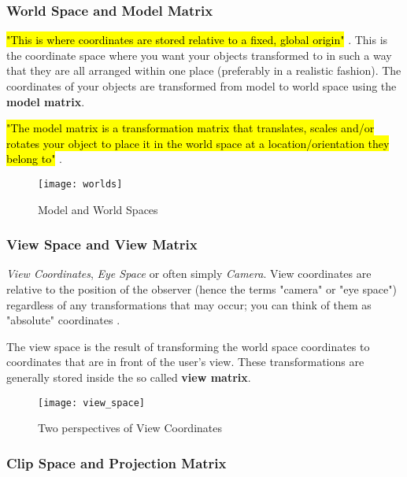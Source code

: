 \subsubsection{World Space and Model Matrix}

\hl{"This is where coordinates are stored relative to a fixed, global origin"} \cite{superbible}.
This is the coordinate space where you want your objects transformed to in such a way that they are all arranged within one place (preferably in a realistic fashion). The coordinates of your objects are transformed from model to world space using the \textbf{model matrix}.

 \label{model-matrix}

\hl{"The model matrix is a transformation matrix that translates, scales and/or rotates your object to place it in the world space at a location/orientation they belong to"} \cite{learnopengl}. 
\begin{figure}[h!]
	\centering
	\texttt{[image: worlds]}
	\caption{Model and World Spaces \cite{3dgraphics}}
	\label{fig:world-model-space}
\end{figure}

\subsubsection{View Space and View Matrix} \label{view-matrix}

\emph{View Coordinates}, \emph{Eye Space} or often simply \emph{Camera}. View coordinates are relative to the position of the observer (hence the terms "camera" or "eye space") regardless of any transformations that may occur; you can think of them as "absolute" coordinates \cite{superbible}.

The view space is the result of transforming the world space coordinates to coordinates that are in front of the user's view. These transformations are generally stored inside the so called \textbf{view matrix}.

\begin{figure}[h!]
	\centering
	\texttt{[image: view\_space]}
	\caption{Two perspectives of View Coordinates \cite{superbible}}
	\label{fig:view-space}
\end{figure}

\subsubsection{Clip Space and Projection Matrix}

